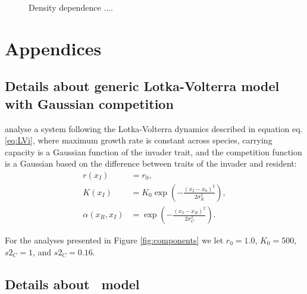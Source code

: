 \documentclass[a4paper,11pt]{article}
\begin{document}
\begin{figure}[h]
  \centering
  \caption{Density dependence
  ....}
  \label{fig:dd}
\end{figure}

\clearpage




\section{Appendices}

\subsection{Details about generic Lotka-Volterra model with
Gaussian competition}\label{sec:DD99}

\citet{Dieckmann-1999} analyse a system following the Lotka-Volterra dynamics
described in equation eq. \ref{eq:LVi}, where maximum growth rate is constant
across species, carrying capacity is a Gaussian
function of the invader trait, and the competition function is a Gaussian
based on the difference between traits of the invader and resident:
\begin{subequations}
\begin{align}
\label{eq:DD}
r(x_I) &= r_0, \\
K(x_I) &= K_0 \exp\left(-\frac{\left(x_I-x_0\right)^2}{2\sigma^2_K}\right),\\
\alpha(x_R, x_I) &= \exp\left(-\frac{\left(x_I-x_R\right)^2}{2\sigma^2_C}\right).
\end{align}
\end{subequations}

For the analyses presented in Figure \ref{fig:components} we let $r_0=1.0$, $K_0=500$,
 $s2_C=1$, and $s2_C=0.16$.

\subsection{Details about \Rstar\ model}\label{sec:Rstar}
\end{document}
